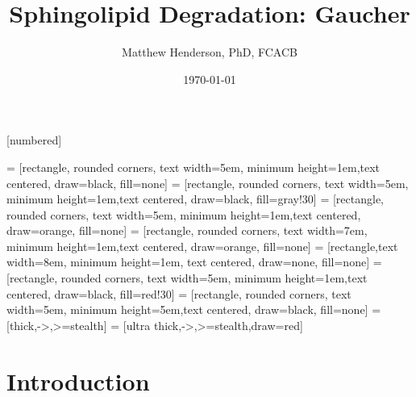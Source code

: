 \documentclass[presentation, smaller]{beamer}
\author{Matthew Henderson, PhD, FCACB}
\date{\today}
\title{Sphingolipid Degradation: Gaucher}
\institute[NSO]{Newborn Screening Ontario | The University of Ottawa}
\begin{document}
\maketitle

\vspace{220pt}
\beamertemplatenavigationsymbolsempty
{}[numbered]

 = [rectangle, rounded corners, text width=5em, minimum height=1em,text centered, draw=black, fill=none]
 = [rectangle, rounded corners, text width=5em, minimum height=1em,text centered, draw=black, fill=gray!30]
 = [rectangle, rounded corners, text width=5em, minimum height=1em,text centered, draw=orange, fill=none]
 = [rectangle, rounded corners, text width=7em, minimum height=1em,text centered, draw=orange, fill=none]
 = [rectangle,text width=8em, minimum height=1em, text centered, draw=none, fill=none]
 = [rectangle, rounded corners, text width=5em, minimum height=1em,text centered, draw=black, fill=red!30]
 = [rectangle, rounded corners, text width=5em, minimum height=5em,text centered, draw=black, fill=none]
 = [thick,->,>=stealth]
 = [ultra thick,->,>=stealth,draw=red]

\section{Introduction}
\label{sec:orgheadline7}
\end{document}
